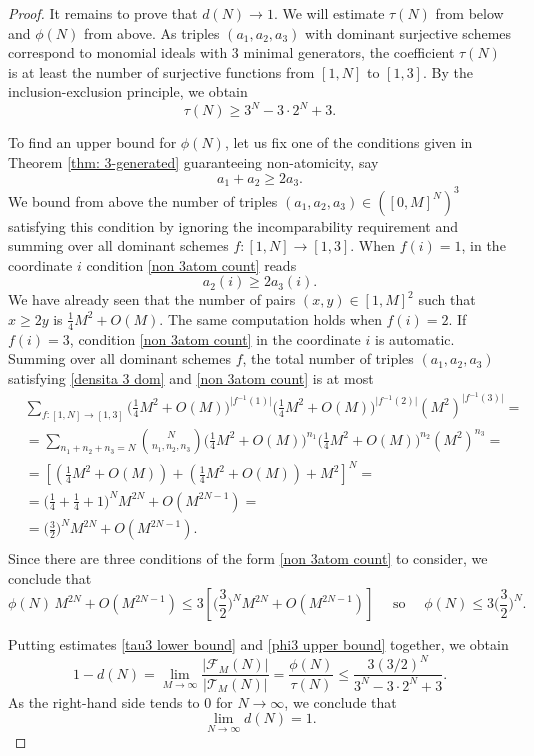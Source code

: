 \documentclass[a4paper,10pt,reqno]{amsart}
\theoremstyle{definition}
\theoremstyle{definition}
\begin{document}
\begin{proof}
It remains to prove that $d(N)\to 1$. We will estimate $\tau(N)$ from below and $\phi(N)$ from above. As triples $(a_1,a_2,a_3)$ with dominant surjective schemes correspond to monomial ideals with $3$ minimal generators, the coefficient $\tau(N)$ is at least the number of surjective functions from $[1,N]$ to $[1,3]$. By the inclusion-exclusion principle, we obtain
\begin{equation}\label{tau3 lower bound}
    \tau(N)\ge 3^N-3\cdot 2^N+3.
\end{equation}

To find an upper bound for $\phi(N)$, let us fix one of the conditions given in Theorem \ref{thm: 3-generated} guaranteeing non-atomicity, say
\begin{equation}\label{non 3atom count}
    a_1+a_2\ge 2a_3.
\end{equation}
We bound from above the number of triples $(a_1,a_2,a_3)\in([0,M]^N)^3$ satisfying this condition by ignoring the incomparability requirement and summing over all dominant schemes $f\colon [1,N]\to [1,3]$. When $f(i)=1$, in the coordinate $i$ condition \eqref{non 3atom count} reads
\[ a_2(i)\ge 2a_3(i).\]
 We have already seen that the number of pairs $(x,y)\in[1,M]^2$ such that $x\ge 2y$ is $\frac14M^2+O(M)$. The same computation holds when $f(i)=2$. If $f(i)=3$, condition \eqref{non 3atom count} in the coordinate $i$ is automatic. Summing over all dominant schemes $f$, the total number of triples $(a_1,a_2,a_3)$ satisfying \eqref{densita 3 dom} and \eqref{non 3atom count} is at most
 \begin{align*}
     & \sum_{f\colon [1,N]\to[1,3]} \biggl(\frac14 M^2+O(M)\biggr) ^{\lvert f^{-1}(1)\rvert} \biggl(\frac14 M^2+O(M)\biggr)^{\lvert f^{-1}(2)\rvert} (M^2)^{\lvert f^{-1}(3)\rvert} =\\
     &= \sum_{n_1+n_2+n_3=N} \binom{N}{n_1,n_2,n_3} \biggl(\frac14 M^2+O(M)\biggr)^{n_1}\biggl(\frac14 M^2+O(M)\biggr)^{n_2} (M^2)^{n_3} =\\
     &=\left[\left(\frac14 M^2+O(M)\right)+\left(\frac14 M^2+O(M)\right)+ M^2\right]^N=\\
     &= \biggl( \frac14+\frac14+1\biggr)^N M^{2N} + O(M^{2N-1}) =\\ 
     &=\biggl(\frac32\biggr)^N M^{2N} + O(M^{2N-1}). \\
 \end{align*}
Since there are three conditions of the form \eqref{non 3atom count} to consider, we conclude that
\begin{equation}\label{phi3 upper bound}
    \phi(N)\,M^{2N}+O(M^{2N-1})\le 3\left[ \biggl(\frac32\biggr)^N M^{2N} + O(M^{2N-1})\right] \quad\text{ so } \quad \phi(N)\le 3\biggl(\frac32\biggr)^N.
\end{equation}

Putting estimates \eqref{tau3 lower bound} and \eqref{phi3 upper bound} together, we obtain
\[ 1-d(N) = \lim_{M\to\infty}\frac{\lvert \mathcal F_M(N)\rvert}{\lvert \mathcal T_M(N)\rvert} = \frac{\phi(N)}{\tau(N)} \le \frac{3(3/2)^N}{3^N-3\cdot 2^N+3}.\]
As the right-hand side tends to $0$ for $N\to\infty$, we conclude that
\[ \lim_{N\to\infty}d(N)=1.\]
\end{proof}
\end{document}

